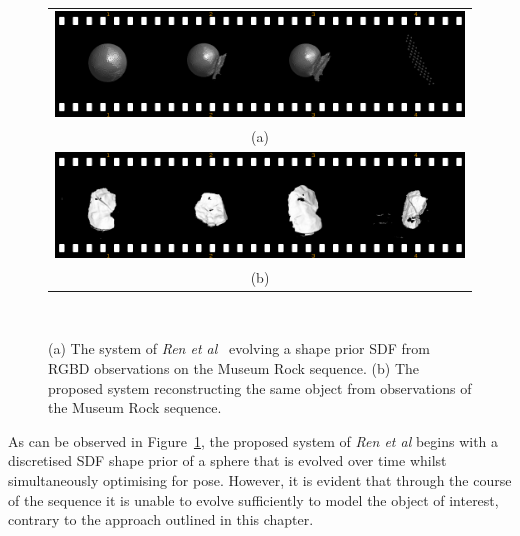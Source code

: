 \begin{figure}[!htbp]
  \centering
  \begin{tabular}{@{}c@{}}
    \includegraphics[width=.75\linewidth]{figures/object_recon/strips/rock_s3d.png} \\
    (a) \\
    \includegraphics[width=.75\linewidth]{figures/object_recon/strips/rock.png} \\ 
    (b)\\
  \end{tabular}
  \caption[Probabilistic Object Reconstruction Qualitative Results I]
  {(a) The system of \textit{Ren et al}~\cite{Ren2013} evolving a shape prior SDF 
  from RGBD observations on the Museum Rock sequence. (b) The proposed system reconstructing 
  the same object from observations of the Museum Rock sequence.}
~\label{figure:probobj_rock_s3d}
\end{figure}

As can be observed in Figure~\ref{figure:probobj_rock_s3d}, the proposed system of 
\textit{Ren et al} begins with a discretised SDF shape prior of a sphere that is 
evolved over time whilst simultaneously optimising for pose. However, it is evident 
that through the course of the sequence it is unable to evolve sufficiently to model 
the object of interest, contrary to the approach outlined in this chapter.

